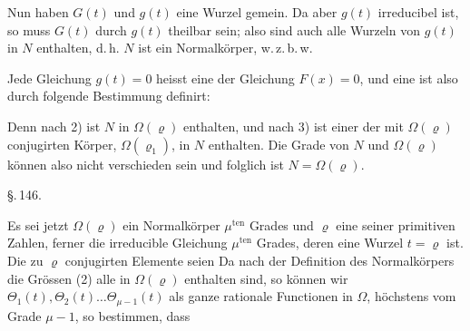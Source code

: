 
Nun haben $G(t)$ und $g(t)$ eine Wurzel gemein. Da aber $g(t)$ irreducibel ist, so muss $G(t)$ durch $g(t)$ theilbar sein; also sind auch alle Wurzeln von $g(t)$ in $N$ enthalten, d.\,h. $N$ ist ein Normalkörper, w.\,z.\,b.\,w.

Jede Gleichung $g(t) = 0$ heisst eine  der Gleichung $F(x) = 0$, und eine  ist also durch folgende Bestimmung definirt:


Denn nach 2) ist $N$ in $\Omega(\varrho)$ enthalten, und nach 3) ist einer der mit $\Omega(\varrho)$ conjugirten Körper, $\Omega(\varrho_1)$, in $N$ enthalten. Die Grade von $N$ und $\Omega(\varrho)$ können also nicht verschieden sein und folglich ist $N = \Omega(\varrho)$.


\begin{center}
\S.\,146.

\end{center}

Es sei jetzt $\Omega(\varrho)$ ein Normalkörper $\mu^{\mathrm{ten}}$ Grades und $\varrho$ eine seiner primitiven Zahlen, ferner
die irreducible Gleichung $\mu^{\mathrm{ten}}$ Grades, deren eine Wurzel $t = \varrho$ ist. Die zu $\varrho$ conjugirten Elemente seien
Da nach der Definition des Normalkörpers die Grössen (2) alle in $\Omega(\varrho)$ enthalten sind, so können wir $\Theta_1(t), \Theta_2(t) \ldots \Theta_{\mu-1}(t)$ als ganze rationale Functionen in $\Omega$, höchstens vom Grade $\mu - 1$, so bestimmen, dass
